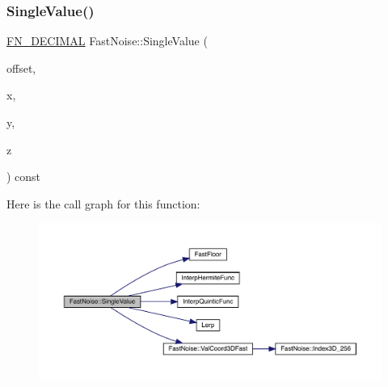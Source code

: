 \subsubsection{\texorpdfstring{Single\+Value()}{SingleValue()}\hspace{0.1cm}{\footnotesize\ttfamily [2/2]}}
{\footnotesize\ttfamily \mbox{\hyperlink{_fast_noise_8h_a75a9ef6d2541c4921815b885bfd449c3}{F\+N\+\_\+\+D\+E\+C\+I\+M\+AL}} Fast\+Noise\+::\+Single\+Value (\begin{DoxyParamCaption}\item[{unsigned char}]{offset,  }\item[{\mbox{\hyperlink{_fast_noise_8h_a75a9ef6d2541c4921815b885bfd449c3}{F\+N\+\_\+\+D\+E\+C\+I\+M\+AL}}}]{x,  }\item[{\mbox{\hyperlink{_fast_noise_8h_a75a9ef6d2541c4921815b885bfd449c3}{F\+N\+\_\+\+D\+E\+C\+I\+M\+AL}}}]{y,  }\item[{\mbox{\hyperlink{_fast_noise_8h_a75a9ef6d2541c4921815b885bfd449c3}{F\+N\+\_\+\+D\+E\+C\+I\+M\+AL}}}]{z }\end{DoxyParamCaption}) const\hspace{0.3cm}{\ttfamily [private]}}

Here is the call graph for this function\+:
\nopagebreak
\begin{figure}[H]
\begin{center}
\leavevmode
\includegraphics[width=350pt]{d1/dd8/class_fast_noise_a982fae6250ecadc33331384167fcbc2d_cgraph}
\end{center}
\end{figure}
\mbox{\label{class_fast_noise_a9ce9cdb72f3c9acaf76511d723e8e1ae}} 
